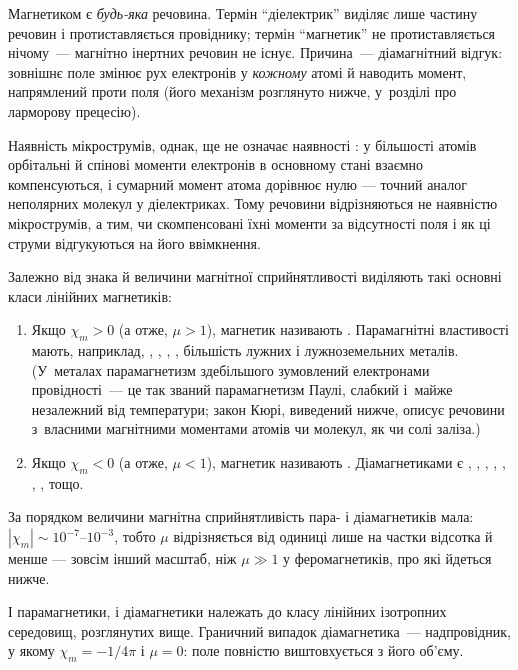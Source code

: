 Магнетиком є \emph{будь-яка} речовина. Термін \enquote{діелектрик} виділяє
лише частину речовин і протиставляється провіднику; термін \enquote{магнетик}
не протиставляється нічому~--- магнітно інертних речовин не існує. Причина~--- діамагнітний відгук: зовнішнє поле змінює рух електронів у \emph{кожному} атомі й наводить момент, напрямлений проти поля (його механізм розглянуто нижче, у~розділі про ларморову прецесію).

Наявність мікрострумів, однак, ще не означає наявності : у більшості атомів орбітальні й спінові моменти електронів в
основному стані взаємно компенсуються, і сумарний момент атома дорівнює нулю
--- точний аналог неполярних молекул у діелектриках. Тому речовини
відрізняються не наявністю мікрострумів, а тим, чи скомпенсовані їхні моменти
за відсутності поля і як ці струми відгукуються на його ввімкнення.

Залежно від знака й величини магнітної сприйнятливості виділяють такі
основні класи лінійних магнетиків:
\begin{enumerate}
	\item Якщо $\chi_m > 0$ (а отже, $\mu>1$), магнетик називають
	      . Парамагнітні властивості мають, наприклад,
	      , , , , більшість лужних і лужноземельних металів.
	      (У~металах парамагнетизм здебільшого зумовлений електронами
	      провідності~--- це так званий парамагнетизм Паулі, слабкий і~майже
	      незалежний від температури; закон Кюрі, виведений нижче, описує речовини
	      з~власними магнітними моментами атомів чи молекул, як  чи солі
	      заліза.)
	\item Якщо $\chi_m < 0$ (а отже, $\mu<1$), магнетик називають
	      . Діамагнетиками є , , , , ,
	      , ,  тощо.
\end{enumerate}

За порядком величини магнітна сприйнятливість пара- і діамагнетиків мала: $|\chi_m|\sim10^{-7}$--$10^{-3}$,
тобто $\mu$ відрізняється від одиниці лише на частки відсотка й менше --- зовсім інший масштаб, ніж $\mu\gg1$
у феромагнетиків, про які йдеться нижче.

І парамагнетики, і діамагнетики належать до класу лінійних ізотропних
середовищ, розглянутих вище. Граничний випадок діамагнетика~--- надпровідник, у якому $\chi_m=-1/4\pi$ і $\mu=0$: поле повністю виштовхується з його об'єму.

